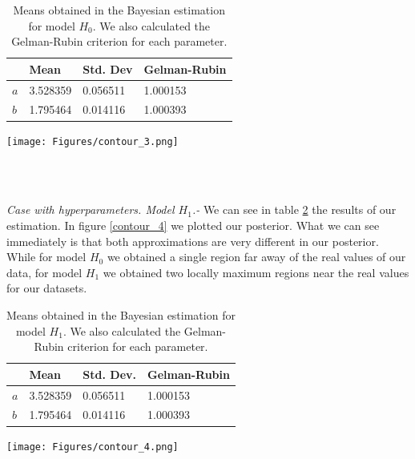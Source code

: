 \documentclass[onecolumn,           %
               showpacs,            %
               preprintnumbers,     %
               aps,                 %
               letterpaper,             %
               superscriptaddress,      %
               nofootinbib,         %
               tightenlines,        %
               floats,floatfix      %
               ,usenatbib,
               ]{revtex4-1}
\begin{document}
\begin{table}[h!]
\centering
\begin{tabular}{||l|l|l|l||} 
 \hline
 & \textbf{Mean} & \textbf{Std. Dev} & \textbf{Gelman-Rubin} \\ [0.5ex] 
 \hline\hline
$a$ & 3.528359 	 & 0.056511 & 1.000153 \\
\hline
$b$ & 1.795464 & 0.014116 	 	 & 1.000393\\ [1ex] 
 \hline
\end{tabular}
\caption{\footnotesize{Means obtained in the Bayesian estimation for model $H_0$. We also calculated the Gelman-Rubin criterion for each parameter.}}
\label{tab2}
\end{table}

\begin{minipage}{\textwidth}
\centering
\texttt{[image: Figures/contour\_3.png]}
\label{contour_3}
\end{minipage}\\ $ $

\textit{Case with hyperparameters. Model $H_1$.-} We can see in table \ref{tab3} the results of our estimation. In figure \ref{contour_4} we plotted our posterior. What we can see immediately is that both approximations are very different in our posterior. While for model $H_0$ we obtained a single region far away of the real values of our data, for model $H_1$ we obtained two locally maximum regions near the real values for our datasets.  

\begin{table}[h!]
\centering
\begin{tabular}{||l|l|l|l||} 
 \hline
 & \textbf{Mean} & \textbf{Std. Dev.} & \textbf{Gelman-Rubin} \\ [0.5ex] 
 \hline\hline
$a$ & 3.528359 	 & 0.056511 & 1.000153 \\
\hline
$b$ & 1.795464 & 0.014116 	 	 & 1.000393\\ [1ex] 
 \hline
\end{tabular}
\caption{\footnotesize{Means obtained in the Bayesian estimation for model $H_1$. We also calculated the Gelman-Rubin criterion for each parameter.}}
\label{tab3}
\end{table}

\begin{minipage}{\textwidth}
\centering
\texttt{[image: Figures/contour\_4.png]}
\label{contour_4}
\end{minipage}\\ $ $
\end{document}
